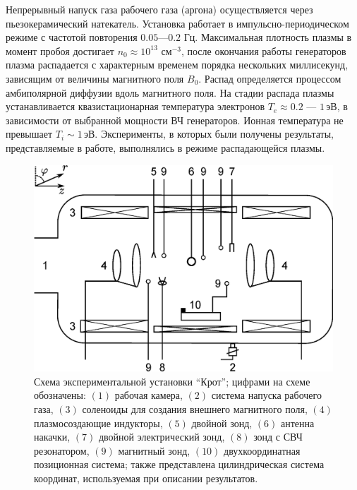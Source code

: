 \documentclass[autoref,10pt]{disser}
\begin{document}
Непрерывный напуск газа рабочего газа (аргона) осуществляется через пьезокерамический натекатель. Установка работает в импульсно-периодическом режиме с частотой повторения $0.05$---$0.2$ Гц. Максимальная плотность плазмы в момент пробоя достигает $n_{0} \approx 10^{13}$ см$^{-3}$, после окончания работы генераторов плазма распадается с характерным временем порядка нескольких миллисекунд, зависящим от величины магнитного поля $B_{0}$. Распад определяется процессом амбиполярной диффузии вдоль магнитного поля. На стадии распада плазмы устанавливается квазистационарная температура электронов $T_{e} \approx 0.2$ --- $1$\,эВ, в зависимости от выбранной мощности ВЧ генераторов. Ионная температура не превышает $T_{i} \sim 1$\,эВ. Эксперименты, в которых были получены результаты, представляемые в работе, выполнялись в режиме распадающейся плазмы.
\begin{figure}[H]
    \centering
    \includegraphics*[width=0.9\columnwidth]{pics/KROT.eps}
    \caption{Схема экспериментальной установки ``Крот''; цифрами на схеме обозначены:  $(1)$ рабочая камера,  $(2)$ система напуска рабочего газа, $(3)$  соленоиды для создания внешнего магнитного поля, $(4)$ плазмосоздающие индукторы, $(5)$ двойной зонд, $(6)$ антенна накачки, $(7)$ двойной электрический зонд, $(8)$ зонд с СВЧ резонатором, $(9)$ магнитный зонд, $(10)$ двухкоординатная позиционная система; также представлена цилиндрическая система  координат, используемая при описании результатов.}
    \label{fig:KROT}
 \end{figure}
\end{document}
